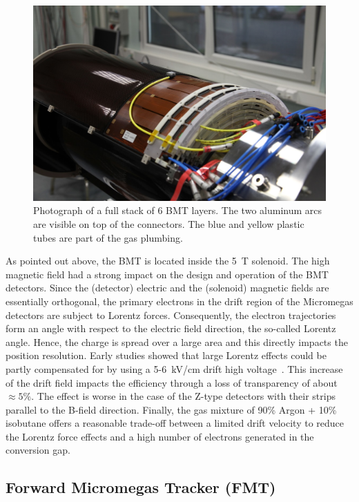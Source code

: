 \begin{figure}[htb]
 \includegraphics[width=1.0\columnwidth,keepaspectratio]{images/fig5}
 \caption{Photograph of a full stack of 6 BMT layers. The two aluminum arcs are visible on top of the connectors. The blue and
   yellow plastic tubes are part of the gas plumbing.}
 \label{fig:mm-fig4}
\end{figure}

As pointed out above, the BMT is located inside the 5~T solenoid. The high magnetic field had a strong impact on the design and
operation of the BMT detectors. Since the (detector) electric and the (solenoid) magnetic fields are essentially orthogonal, the
primary electrons in the drift region of the Micromegas detectors are subject to Lorentz forces. Consequently, the electron
trajectories form an angle with respect to the electric field direction, the so-called Lorentz angle. Hence, the charge is spread
over a large area and this directly impacts the position resolution. Early studies showed that large Lorentz effects could be
partly compensated for by using a 5-6~kV/cm drift high voltage~\cite{KONCZYKOWSKI2010274}. This increase of the drift
field impacts the efficiency through a loss of transparency of about \(\approx5\%\). The effect is worse in the case of the
Z-type detectors with their strips parallel to the B-field direction. Finally, the gas mixture of 90\% Argon + 10\% isobutane
offers a reasonable trade-off between a limited drift velocity to reduce the Lorentz force effects and a high number of
electrons generated in the conversion gap. 

\subsection{Forward Micromegas Tracker (FMT)}

